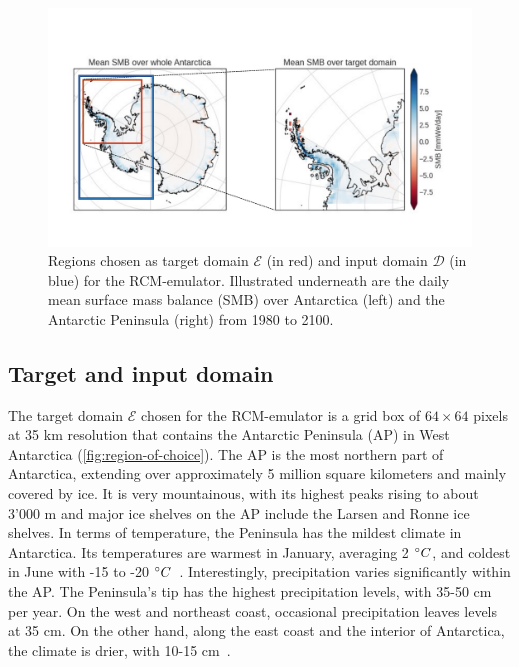 \documentclass[a4paper,11pt,oneside]{report}
\begin{document}
\begin{figure}[!t]
  \centering
  \includegraphics[width=\columnwidth]{images/domains.pdf}
  \caption []{\small Regions chosen as target domain $\mathcal{E}$ (in red) and input domain $\mathcal{D}$ (in blue) for the RCM-emulator. Illustrated underneath are the daily mean surface mass balance (SMB) over Antarctica (left) and the Antarctic Peninsula (right) from 1980 to 2100.}
  \vspace{-3mm}
    \label{fig:region-of-choice}
\end{figure}


\subsection{Target and input domain}
The target domain $\mathcal{E}$ chosen for the RCM-emulator is a grid box of $64 \times 64$ pixels at 35 \si{km} resolution that contains the Antarctic Peninsula (AP) in West Antarctica (\autoref{fig:region-of-choice}). The AP is the most northern part of Antarctica, extending over approximately 5 million square kilometers and mainly covered by ice. It is very mountainous, with its highest peaks rising to about 3'000 \si{m} and major ice shelves on the AP include the Larsen and Ronne ice shelves. In terms of temperature, the Peninsula has the mildest climate in Antarctica. Its temperatures are warmest in January, averaging 2 $\degree C$, and coldest in June with -15 to -20 $\degree C$~\cite{AntarcticPeninsula}. Interestingly, precipitation varies significantly within the AP. The Peninsula's tip has the highest precipitation levels, with 35-50 \si{cm} per year. On the west and northeast coast, occasional precipitation leaves levels at 35 \si{cm}. On the other hand, along the east coast and the interior of Antarctica, the climate is drier, with 10-15 \si{cm}~\cite{antarctic-climate, antarctic-climate-2}. 
\end{document}
